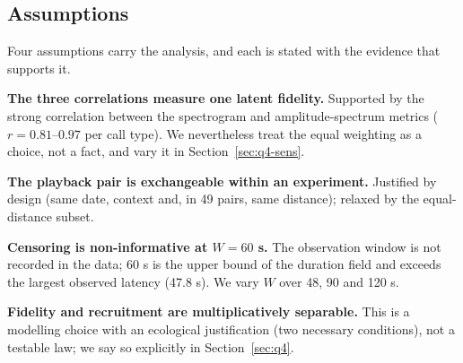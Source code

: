 \subsection{Assumptions}

Four assumptions carry the analysis, and each is stated with the evidence that supports it.

\begin{description}[leftmargin=1.2em,itemsep=2pt]
  \item[A1] \textbf{The three correlations measure one latent fidelity.} Supported by the strong
  correlation between the spectrogram and amplitude-spectrum metrics ($r=0.81$--$0.97$ per call
  type). We nevertheless treat the equal weighting as a choice, not a fact, and vary it in
  Section~\ref{sec:q4-sens}.
  \item[A2] \textbf{The playback pair is exchangeable within an experiment.} Justified by design
  (same date, context and, in 49 pairs, same distance); relaxed by the equal-distance subset.
  \item[A3] \textbf{Censoring is non-informative at $W=60$ s.} The observation window is not
  recorded in the data; 60 s is the upper bound of the duration field and exceeds the largest
  observed latency (47.8 s). We vary $W$ over 48, 90 and 120 s.
  \item[A4] \textbf{Fidelity and recruitment are multiplicatively separable.} This is a modelling
  choice with an ecological justification (two necessary conditions), not a testable law; we say
  so explicitly in Section~\ref{sec:q4}.
\end{description}
